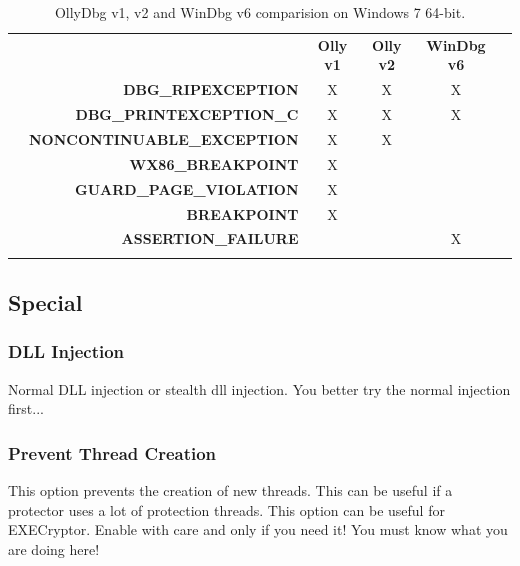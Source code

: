 \documentclass[10pt,a4paper]{article}
\begin{document}
\begin{table}[H]
\caption{OllyDbg v1, v2 and WinDbg v6 comparision on Windows 7 64-bit.}
\begin{tabular}{lrcccl}
 & \multicolumn{1}{c}{} & \textbf{Olly v1}    & \textbf{Olly v2}    & \textbf{WinDbg v6}    &  \\
 & \textbf{DBG\_RIPEXCEPTION}     & X                    & X                    & X                    &  \\
 & \textbf{DBG\_PRINTEXCEPTION\_C}      & X                    & X                    & X                    &  \\
 & \textbf{NONCONTINUABLE\_EXCEPTION}      & X                    & X                    &                     &  \\
 & \textbf{WX86\_BREAKPOINT}      & X                    &                     &                     &  \\
 & \textbf{GUARD\_PAGE\_VIOLATION}      & X                    &                     &                     &  \\
 & \textbf{BREAKPOINT}      & X                    &                     &                     &  \\
 & \textbf{ASSERTION\_FAILURE}      &                     &                     & X                    &  \\
 & \multicolumn{1}{l}{} & \multicolumn{1}{l}{} & \multicolumn{1}{l}{} & \multicolumn{1}{l}{} & 
\end{tabular}
\end{table}

\subsection{Special}
\subsubsection{DLL Injection}
Normal DLL injection or stealth dll injection. You better try the normal injection first...

\subsubsection{Prevent Thread Creation}
This option prevents the creation of new threads. This can be useful if a protector uses a lot of protection threads. This option can be useful for EXECryptor. Enable with care and only if you need it! You must know what you are doing here!
\end{document}
